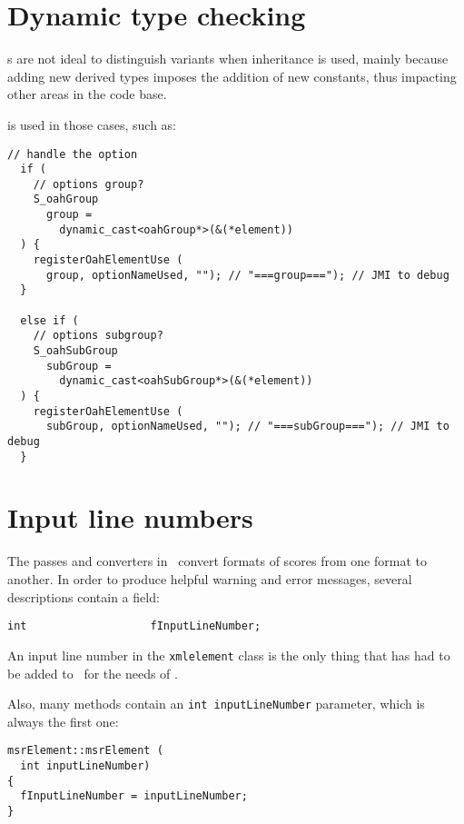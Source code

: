 \section{Dynamic type checking}

\EnumType s are not ideal to distinguish variants when inheritance is used, mainly because adding new derived types imposes the addition of new constants, thus impacting other areas in the code base.

 is used in those cases, such as:
\begin{lstlisting}[language=CPlusPlus]
  // handle the option
  if (
    // options group?
    S_oahGroup
      group =
        dynamic_cast<oahGroup*>(&(*element))
  ) {
    registerOahElementUse (
      group, optionNameUsed, ""); // "===group==="); // JMI to debug
  }

  else if (
    // options subgroup?
    S_oahSubGroup
      subGroup =
        dynamic_cast<oahSubGroup*>(&(*element))
  ) {
    registerOahElementUse (
      subGroup, optionNameUsed, ""); // "===subGroup==="); // JMI to debug
  }
\end{lstlisting}


\section{Input line numbers}

The passes and converters in \mf\ convert formats of scores from one format to another. In order to produce helpful warning and error messages, several descriptions contain a field:
\begin{lstlisting}[language=CPlusPlus]
    int                   fInputLineNumber;
\end{lstlisting}

An input line number in the {\tt xmlelement} class   is the only thing that has had to be added to \libmusicxml\ for the needs of \mf.

Also, many methods contain an {\tt int inputLineNumber} parameter, which is always the first one:
\begin{lstlisting}[language=CPlusPlus]
msrElement::msrElement (
  int inputLineNumber)
{
  fInputLineNumber = inputLineNumber;
}
\end{lstlisting}

